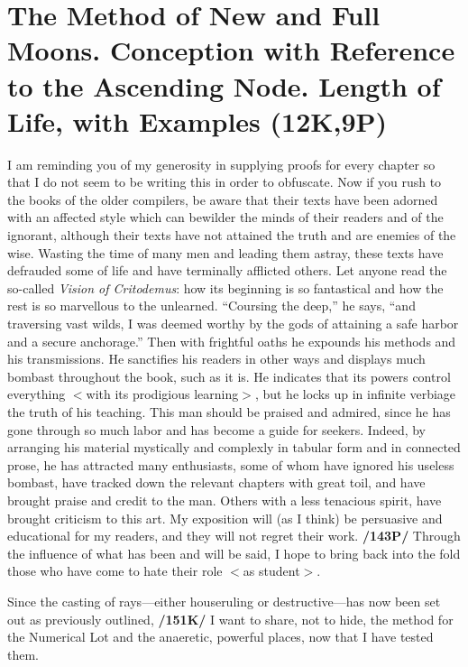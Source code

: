\section{The Method of New and Full Moons. Conception with Reference to the Ascending Node. Length of Life, with Examples (12K,9P)}

I am reminding you of my generosity in supplying proofs for every chapter so that I do not seem to be writing this in order to obfuscate. Now if you rush to the books of the older compilers, be aware that their texts have been adorned with an affected style which can bewilder the minds of their readers and of the ignorant, although their texts have not attained the truth and are enemies of the wise. Wasting the time of
many men and leading them astray, these texts have defrauded some of life and have terminally afflicted others. 
Let anyone read the so-called  \textit{Vision of Critodemus}: how its beginning is so fantastical and how the rest is so marvellous to the unlearned. “Coursing the deep,” he says, “and traversing vast wilds, I was deemed worthy by the gods of attaining a safe harbor and a secure anchorage.” Then with frightful oaths he expounds his methods and his transmissions. He sanctifies his readers in other ways and displays much
bombast throughout the book, such as it is. He indicates that its powers control everything $<$with its prodigious learning$>$, but he locks up in infinite verbiage the truth of his teaching. This man should be praised and admired, since he has gone through so much labor and has become a guide for seekers. Indeed, by arranging his material mystically and complexly in tabular form and in connected prose, he has attracted many enthusiasts, some of whom have ignored his useless bombast, have tracked down the relevant chapters with great toil, and have brought praise and credit to the man. Others with a less tenacious spirit, have brought criticism to this art. My exposition will (as I think) be persuasive and educational for my readers, and they will not regret
their work. \textbf{/143P/} Through the influence of what has been and will be said, I hope to bring back into the fold those who have come to hate their role $<$as student$>$.

Since the casting of rays—either houseruling or destructive—has now been set out as previously outlined, \textbf{/151K/} I want to share, not to hide, the method for the Numerical Lot and the anaeretic, powerful places, now that I have tested them. 

